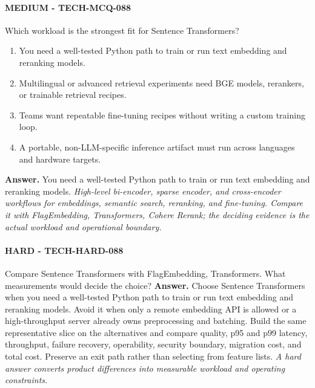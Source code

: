 \paragraph{MEDIUM - TECH-MCQ-088} Which workload is the strongest fit for Sentence Transformers?
\begin{enumerate}[label=\Alph*.]
\item You need a well-tested Python path to train or run text embedding and reranking models.
\item Multilingual or advanced retrieval experiments need BGE models, rerankers, or trainable retrieval recipes.
\item Teams want repeatable fine-tuning recipes without writing a custom training loop.
\item A portable, non-LLM-specific inference artifact must run across languages and hardware targets.
\end{enumerate}
\textbf{Answer.} You need a well-tested Python path to train or run text embedding and reranking models.
\textit{High-level bi-encoder, sparse encoder, and cross-encoder workflows for embeddings, semantic search, reranking, and fine-tuning. Compare it with FlagEmbedding, Transformers, Cohere Rerank; the deciding evidence is the actual workload and operational boundary.}
\paragraph{HARD - TECH-HARD-088} Compare Sentence Transformers with FlagEmbedding, Transformers. What measurements would decide the choice?
\textbf{Answer.} Choose Sentence Transformers when you need a well-tested Python path to train or run text embedding and reranking models. Avoid it when only a remote embedding API is allowed or a high-throughput server already owns preprocessing and batching. Build the same representative slice on the alternatives and compare quality, p95 and p99 latency, throughput, failure recovery, operability, security boundary, migration cost, and total cost. Preserve an exit path rather than selecting from feature lists.
\textit{A hard answer converts product differences into measurable workload and operating constraints.}
